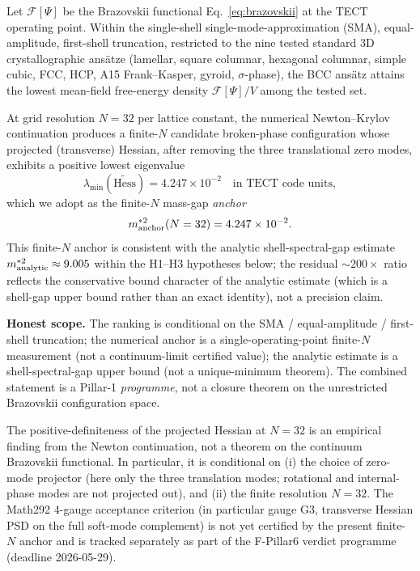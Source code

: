 \begin{theorem}
\label{thm:main}
Let $\mathcal{F}[\Psi]$ be the Brazovskii functional
Eq.~\eqref{eq:brazovskii} at the TECT operating point. Within the
single-shell single-mode-approximation (SMA), equal-amplitude,
first-shell truncation, restricted to the nine tested standard 3D
crystallographic ans\"atze (lamellar, square columnar, hexagonal
columnar, simple cubic, FCC, HCP, A15 Frank--Kasper, gyroid,
$\sigma$-phase), the BCC ans\"atz attains the lowest mean-field
free-energy density $\mathcal{F}[\Psi]/V$ among the tested set.

At grid resolution $N = 32$ per lattice constant, the numerical
Newton--Krylov continuation produces a finite-$N$ candidate broken-phase
configuration whose projected (transverse) Hessian, after removing the
three translational zero modes, exhibits a positive lowest eigenvalue
\[
\lambda_{\min}(\widetilde{\mathrm{Hess}})
= 4.247 \times 10^{-2}\quad\text{in TECT code units},
\]
which we adopt as the finite-$N$ mass-gap \emph{anchor}
\[
m^{*2}_{\rm anchor}(N=32) = 4.247 \times 10^{-2}.
\]
This finite-$N$ anchor is consistent with the analytic
shell-spectral-gap estimate $m^{*2}_{\rm analytic} \approx 9.005$
within the H1--H3 hypotheses below; the residual $\sim 200\times$
ratio reflects the conservative bound character of the analytic
estimate (which is a shell-gap upper bound rather than an exact
identity), not a precision claim.

\textbf{Honest scope.} The ranking is conditional on the SMA /
equal-amplitude / first-shell truncation; the numerical anchor is a
single-operating-point finite-$N$ measurement (not a continuum-limit
certified value); the analytic estimate is a shell-spectral-gap upper
bound (not a unique-minimum theorem). The combined statement is a
Pillar-1 \emph{programme}, not a closure theorem on the unrestricted
Brazovskii configuration space.
\end{theorem}

\begin{remark}
\label{rem:hessian}
The positive-definiteness of the projected Hessian at $N=32$ is an
empirical finding from the Newton continuation, not a theorem on the
continuum Brazovskii functional. In particular, it is conditional on
(i) the choice of zero-mode projector (here only the three
translation modes; rotational and internal-phase modes are not
projected out), and (ii) the finite resolution $N=32$. The Math292
4-gauge acceptance criterion (in particular gauge G3, transverse
Hessian PSD on the full soft-mode complement) is not yet certified by
the present finite-$N$ anchor and is tracked separately as part of
the F-Pillar6 verdict programme (deadline 2026-05-29).
\end{remark}

